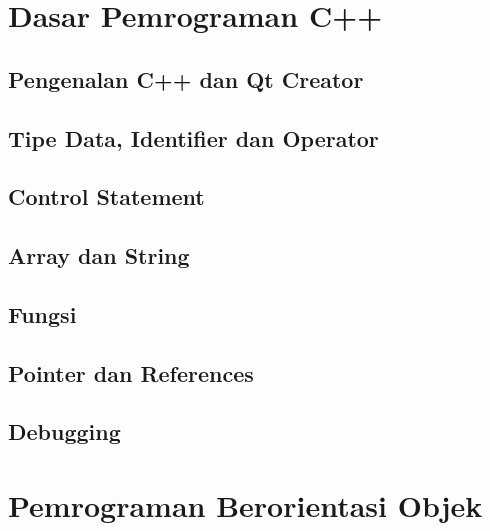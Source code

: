 \documentclass[11pt,b5paper,twoside,titlepage]{book}
\begin{document}
	\part{Dasar Pemrograman C++}\label{part-dasar}

	\chapter{Pengenalan C++ dan Qt Creator}\label{pengenalan}
	

	\chapter{Tipe Data, Identifier dan Operator}\label{tipe-data}
	

	\chapter{Control Statement}\label{control-statement}
	

	\chapter{Array dan String}\label{array-dan-string}
	

	\chapter{Fungsi}\label{fungsi}
	

	\chapter{Pointer dan References}\label{pointer-dan-references}
	

	\chapter{Debugging}\label{debugging}
	

	\part{Pemrograman Berorientasi Objek}\label{part-oop}

\end{document}
